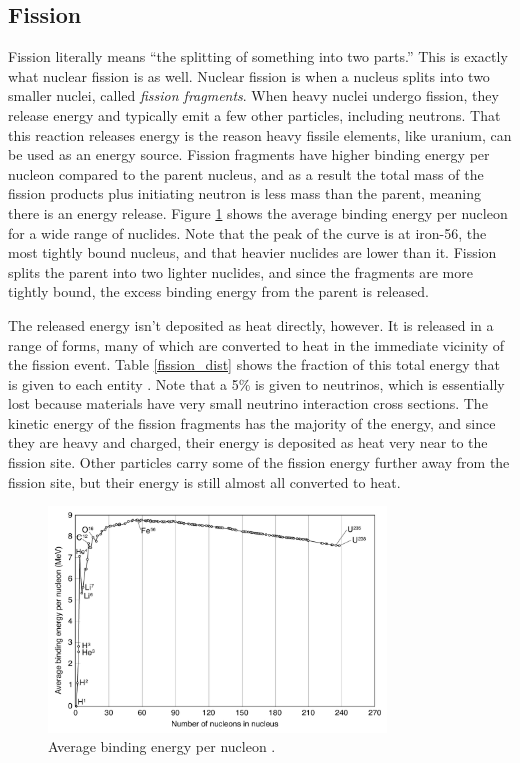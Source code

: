 \subsection{Fission}

Fission literally means ``the splitting of something into two parts.''  This is exactly what nuclear fission is as well.  Nuclear fission is when a nucleus splits into two smaller nuclei, called \emph{fission fragments}.  When heavy nuclei undergo fission, they release energy and typically emit a few other particles, including neutrons.  That this reaction releases energy is the reason heavy fissile elements, like uranium, can be used as an energy source.  Fission fragments have higher binding energy per nucleon compared to the parent nucleus, and as a result the total mass of the fission products plus initiating neutron is less mass than the parent, meaning there is an energy release.  Figure \ref{binding_e_per_nuc} shows the average binding energy per nucleon for a wide range of nuclides.  Note that the peak of the curve is at iron-56, the most tightly bound nucleus, and that heavier nuclides are lower than it.  Fission splits the parent into two lighter nuclides, and since the fragments are more tightly bound, the excess binding energy from the parent is released.  

The released energy isn't deposited as heat directly, however.  It is released in a range of forms, many of which are converted to heat in the immediate vicinity of the fission event.   Table \ref{fission_dist} shows the fraction of this total energy that is given to each entity \cite{duderstadt}.  Note that a 5\% is given to neutrinos, which is essentially lost because materials have very small neutrino interaction cross sections.  The kinetic energy of the fission fragments has the majority of the energy, and since they are heavy and charged, their energy is deposited as heat very near to the fission site.  Other particles carry some of the fission energy further away from the fission site, but their energy is still almost all converted to heat.  
  
\begin{figure}[h!]
  \centering
    \includegraphics[width=0.8\textwidth]{graphics/binding_energy.pdf}
     \caption[Average binding energy per nucleon.]{Average binding energy per nucleon \cite{wikimedia_binding}.\label{binding_e_per_nuc}}
\end{figure}

